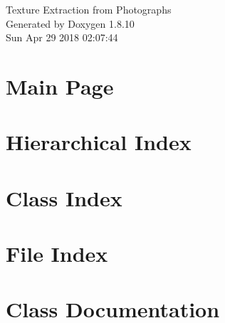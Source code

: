 \documentclass[twoside]{book}
\newcommand{\+}{\discretionary{\mbox{\scriptsize$\hookleftarrow$}}{}{}}
\newcommand{\clearemptydoublepage}{%
  \newpage{\pagestyle{empty}\cleardoublepage}%
}
\begin{document}
\hypersetup{pageanchor=false,
             bookmarks=true,
             bookmarksnumbered=true,
             pdfencoding=unicode
            }
\begin{titlepage}
\vspace*{7cm}
\begin{center}%
{\Large Texture Extraction from Photographs }\\
\vspace*{1cm}
{\large Generated by Doxygen 1.8.10}\\
\vspace*{0.5cm}
{\small Sun Apr 29 2018 02:07:44}\\
\end{center}
\end{titlepage}
\clearemptydoublepage
\tableofcontents
\clearemptydoublepage
{}
\hypersetup{pageanchor=true}

\chapter{Main Page}
\label{index}\hypertarget{index}{}
\chapter{Hierarchical Index}

\chapter{Class Index}

\chapter{File Index}

\chapter{Class Documentation}





























\end{document}
